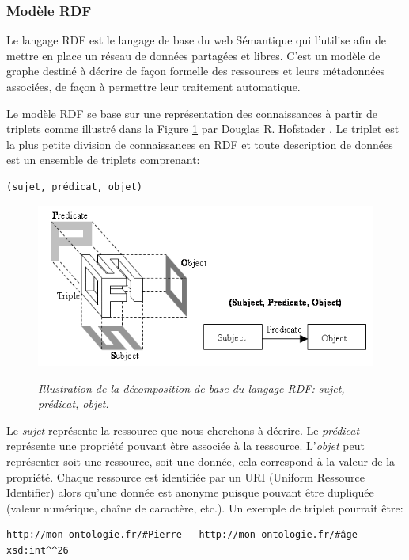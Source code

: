 \subsubsection{Modèle RDF} \label{rdf_model}

Le langage RDF est le langage de base du web Sémantique qui l'utilise afin de mettre en place un réseau de données partagées et libres. C'est un modèle de graphe destiné à décrire de façon formelle des ressources et leurs métadonnées associées, de façon à permettre leur traitement automatique.

Le modèle RDF se base sur une représentation des connaissances à partir de triplets comme illustré dans la Figure \ref{Fig:rdf_hofstader} par Douglas R. Hofstader \cite{douglas1979godel}. Le triplet est la plus petite division de connaissances en RDF et toute description de données est un ensemble de triplets comprenant:

\begin{lstlisting}
(sujet, prédicat, objet)
\end{lstlisting}

\begin{figure}
  \centering
  {\includegraphics[width=.5\linewidth]{./figures/ch2/rdf_hofstader.png}}
    \caption{\it Illustration de la décomposition de base du langage RDF: sujet, prédicat, objet.}
  \label{Fig:rdf_hofstader}
  \hspace{0.3cm}
\end{figure}

Le \textit{sujet} représente la ressource que nous cherchons à décrire. Le \textit{prédicat} représente une propriété pouvant être associée à la ressource. L'\textit{objet} peut représenter soit une ressource, soit une donnée, cela correspond à la valeur de la propriété.
Chaque ressource est identifiée par un URI (Uniform Ressource Identifier) alors qu'une donnée est anonyme puisque pouvant être dupliquée (valeur numérique, chaîne de caractère, etc.). Un exemple de triplet pourrait être:

\begin{lstlisting}
http://mon-ontologie.fr/#Pierre   http://mon-ontologie.fr/#âge  xsd:int^^26
\end{lstlisting}

